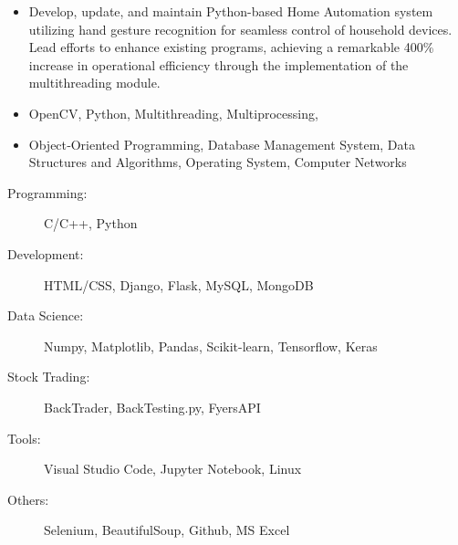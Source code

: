 \documentclass[10pt,a4paper,ragged2e,withhyper]{altacv}
\begin{document}
\begin{paracol}{2}

\begin{itemize}
\item 
Develop, update, and maintain Python-based Home Automation system utilizing hand gesture recognition for seamless control of household devices. Lead efforts to enhance existing programs, achieving a remarkable 400\% increase in operational efficiency through the implementation of the multithreading module.
\item OpenCV, Python, Multithreading, Multiprocessing, 
\end{itemize}



\begin{itemize}
\item Object‐Oriented Programming, Database Management System, Data Structures and Algorithms, Operating System, Computer Networks
 

\end{itemize}

\switchcolumn
{}
\begin{description}
        \item[Programming:] C/C++, Python
        \item[Development:] HTML/CSS, Django, Flask, MySQL, MongoDB
        \item[Data Science:] Numpy, Matplotlib, Pandas, Scikit-learn, Tensorflow, Keras
        \item[Stock Trading:] BackTrader, BackTesting.py, FyersAPI
        \item[Tools:] Visual Studio Code, Jupyter Notebook, Linux
        \item[Others:] Selenium, BeautifulSoup, Github, MS Excel
        

\end{description}
\end{paracol}
\end{document}
